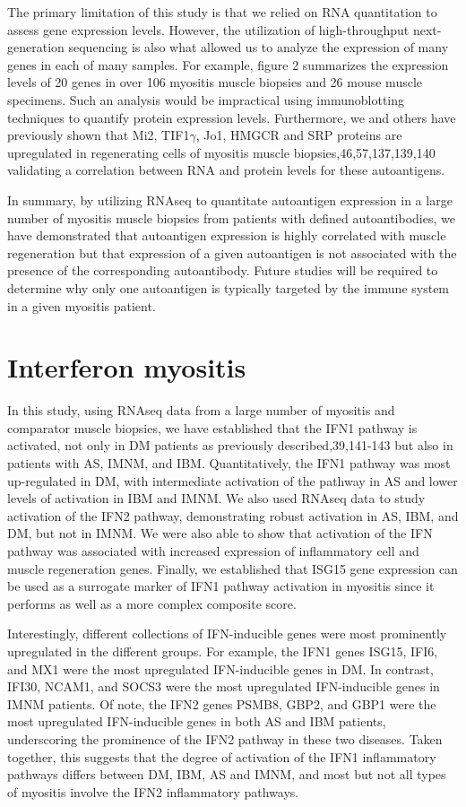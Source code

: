 The primary limitation of this study is that we relied on RNA quantitation to assess gene expression levels.  However, the utilization of high-throughput next-generation sequencing is also what allowed us to analyze the expression of many genes in each of many samples.  For example, figure 2 summarizes the expression levels of 20 genes in over 106 myositis muscle biopsies and 26 mouse muscle specimens.  Such an analysis would be impractical using immunoblotting techniques to quantify protein expression levels.  Furthermore, we and others have previously shown that Mi2, TIF1$\gamma$, Jo1, HMGCR and SRP proteins are upregulated in regenerating cells of myositis muscle biopsies,46,57,137,139,140 validating a correlation between RNA and protein levels for these autoantigens.

In summary, by utilizing RNAseq to quantitate autoantigen expression in a large number of myositis muscle biopsies from patients with defined autoantibodies, we have demonstrated that autoantigen expression is highly correlated with muscle regeneration but that expression of a given autoantigen is not associated with the presence of the corresponding autoantibody. Future studies will be required to determine why only one autoantigen is typically targeted by the immune system in a given myositis patient.

\section{Interferon myositis}
In this study, using RNAseq data from a large number of myositis and comparator muscle biopsies, we have established that the IFN1 pathway is activated, not only in DM patients as previously described,39,141-143 but also in patients with AS, IMNM, and IBM. Quantitatively, the IFN1 pathway was most up-regulated in DM, with intermediate activation of the pathway in AS and lower levels of activation in IBM and IMNM. We also used RNAseq data to study activation of the IFN2 pathway, demonstrating robust activation in AS, IBM, and DM, but not in IMNM. We were also able to show that activation of the IFN pathway was associated with increased expression of inflammatory cell and muscle regeneration genes. Finally, we established that ISG15 gene expression can be used as a surrogate marker of IFN1 pathway activation in myositis since it performs as well as a more complex composite score.

Interestingly, different collections of IFN-inducible genes were most prominently upregulated in the different groups. For example, the IFN1 genes ISG15, IFI6, and MX1 were the most upregulated IFN-inducible genes in DM. In contrast, IFI30, NCAM1, and SOCS3 were the most upregulated IFN-inducible genes in IMNM patients. Of note, the IFN2 genes PSMB8, GBP2, and GBP1 were the most upregulated IFN-inducible genes in both AS and IBM patients, underscoring the prominence of the IFN2 pathway in these two diseases. Taken together, this suggests that the degree of activation of the IFN1 inflammatory pathways differs between DM, IBM, AS and IMNM, and most but not all types of myositis involve the IFN2 inflammatory pathways.

